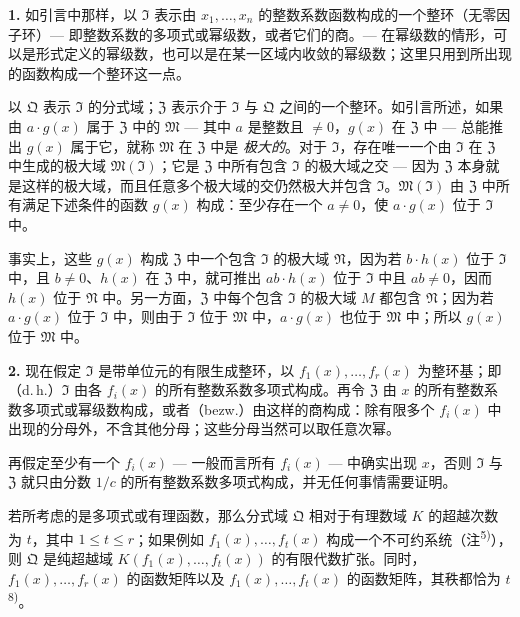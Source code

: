 \noindent\textbf{1.}
如引言中那样，以 $\mathfrak{I}$ 表示由 $x_1,\ldots,x_n$ 的整数系数函数构成的一个整环（无零因子环）--- 即整数系数的多项式或幂级数，或者它们的商。--- 在幂级数的情形，可以是形式定义的幂级数，也可以是在某一区域内收敛的幂级数；这里只用到所出现的函数构成一个整环这一点。

以 $\mathfrak{Q}$ 表示 $\mathfrak{I}$ 的分式域；$\mathfrak{Z}$ 表示介于 $\mathfrak{I}$ 与 $\mathfrak{Q}$ 之间的一个整环。如引言所述，如果由 $a \cdot g(x)$ 属于 $\mathfrak{Z}$ 中的 $\mathfrak{M}$ --- 其中 $a$ 是整数且 $\neq 0$，$g(x)$ 在 $\mathfrak{Z}$ 中 --- 总能推出 $g(x)$ 属于它，就称 $\mathfrak{M}$ 在 $\mathfrak{Z}$ 中是 \textit{极大的}。对于 $\mathfrak{I}$，存在唯一一个由 $\mathfrak{I}$ 在 $\mathfrak{Z}$ 中生成的极大域 $\mathfrak{M}(\mathfrak{I})$；它是 $\mathfrak{Z}$ 中所有包含 $\mathfrak{I}$ 的极大域之交 --- 因为 $\mathfrak{Z}$ 本身就是这样的极大域，而且任意多个极大域的交仍然极大并包含 $\mathfrak{I}$。$\mathfrak{M}(\mathfrak{I})$ 由 $\mathfrak{Z}$ 中所有满足下述条件的函数 $g(x)$ 构成：至少存在一个 $a \neq 0$，使 $a \cdot g(x)$ 位于 $\mathfrak{I}$ 中。

事实上，这些 $g(x)$ 构成 $\mathfrak{Z}$ 中一个包含 $\mathfrak{I}$ 的极大域 $\mathfrak{N}$，因为若 $b \cdot h(x)$ 位于 $\mathfrak{I}$ 中，且 $b \neq 0$、$h(x)$ 在 $\mathfrak{Z}$ 中，就可推出 $ab \cdot h(x)$ 位于 $\mathfrak{I}$ 中且 $ab \neq 0$，因而 $h(x)$ 位于 $\mathfrak{N}$ 中。另一方面，$\mathfrak{Z}$ 中每个包含 $\mathfrak{I}$ 的极大域 $M$ 都包含 $\mathfrak{N}$；因为若 $a \cdot g(x)$ 位于 $\mathfrak{I}$ 中，则由于 $\mathfrak{I}$ 位于 $\mathfrak{M}$ 中，$a \cdot g(x)$ 也位于 $\mathfrak{M}$ 中；所以 $g(x)$ 位于 $\mathfrak{M}$ 中。

\medskip\noindent\textbf{2.}
现在假定 $\mathfrak{I}$ 是带单位元的有限生成整环，以 $f_1(x),\ldots,f_r(x)$ 为整环基；即（d.\,h.）$\mathfrak{I}$ 由各 $f_i(x)$ 的所有整数系数多项式构成。再令 $\mathfrak{Z}$ 由 $x$ 的所有整数系数多项式或幂级数构成，或者（bezw.）由这样的商构成：除有限多个 $f_i(x)$ 中出现的分母外，不含其他分母；这些分母当然可以取任意次幂。

再假定至少有一个 $f_i(x)$ --- 一般而言所有 $f_i(x)$ --- 中确实出现 $x$，否则 $\mathfrak{I}$ 与 $\mathfrak{Z}$ 就只由分数 $1/c$ 的所有整数系数多项式构成，并无任何事情需要证明。

若所考虑的是多项式或有理函数，那么分式域 $\mathfrak{Q}$ 相对于有理数域 $K$ 的超越次数为 $t$，其中 $1 \leq t \leq r$；如果例如 $f_1(x),\ldots,f_t(x)$ 构成一个不可约系统（注\textsuperscript{5)}），则 $\mathfrak{Q}$ 是纯超越域 $K(f_1(x),\ldots,f_t(x))$ 的有限代数扩张。同时，$f_1(x),\ldots,f_r(x)$ 的函数矩阵以及 $f_1(x),\ldots,f_t(x)$ 的函数矩阵，其秩都恰为 $t$\textsuperscript{8)}。


